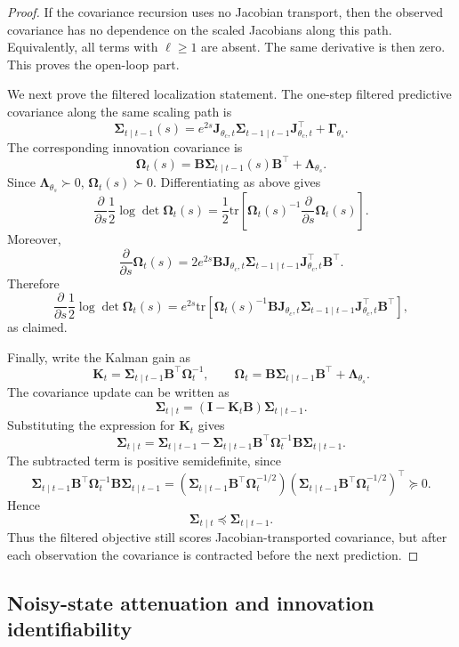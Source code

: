 \documentclass{article}
\theoremstyle{plain}
\theoremstyle{definition}
\theoremstyle{remark}
\newcommand{\tr}{\mathrm{tr}}
\begin{document}
\begin{proof}
If the covariance recursion uses no Jacobian transport, then the observed
covariance has no dependence on the scaled Jacobians along this path. Equivalently,
all terms with $\ell\ge1$ are absent. The same derivative is then zero. This
proves the open-loop part.

We next prove the filtered localization statement. The one-step filtered
predictive covariance along the same scaling path is
\[
\bm\Sigma_{t\mid t-1}(s)
=
e^{2s}
\bm J_{\theta_c,t}\bm\Sigma_{t-1\mid t-1}
\bm J_{\theta_c,t}^{\top}
+
\bm\Gamma_{\theta_s}.
\]
The corresponding innovation covariance is
\[
\bm\Omega_t(s)
=
\bm B\bm\Sigma_{t\mid t-1}(s)\bm B^\top+\bm\Lambda_{\theta_s}.
\]
Since $\bm\Lambda_{\theta_s}\succ0$, $\bm\Omega_t(s)\succ0$. Differentiating as
above gives
\[
\frac{\partial}{\partial s}
\frac12\log\det\bm\Omega_t(s)
=
\frac12
\tr \left[
\bm\Omega_t(s)^{-1}
\frac{\partial}{\partial s}\bm\Omega_t(s)
\right].
\]
Moreover,
\[
\frac{\partial}{\partial s}\bm\Omega_t(s)
=
2e^{2s}
\bm B\bm J_{\theta_c,t}\bm\Sigma_{t-1\mid t-1}
\bm J_{\theta_c,t}^{\top}\bm B^\top.
\]
Therefore
\[
\frac{\partial}{\partial s}
\frac12\log\det\bm\Omega_t(s)
=
e^{2s}
\tr \left[
\bm\Omega_t(s)^{-1}
\bm B\bm J_{\theta_c,t}\bm\Sigma_{t-1\mid t-1}
\bm J_{\theta_c,t}^{\top}\bm B^\top
\right],
\]
as claimed.

Finally, write the Kalman gain as
\[
\bm K_t
=
\bm\Sigma_{t\mid t-1}\bm B^\top\bm\Omega_t^{-1},
\qquad
\bm\Omega_t
=
\bm B\bm\Sigma_{t\mid t-1}\bm B^\top+\bm\Lambda_{\theta_s}.
\]
The covariance update can be written as
\[
\bm\Sigma_{t\mid t}
=
(\bm I-\bm K_t\bm B)\bm\Sigma_{t\mid t-1}.
\]
Substituting the expression for $\bm K_t$ gives
\[
\bm\Sigma_{t\mid t}
=
\bm\Sigma_{t\mid t-1}
-
\bm\Sigma_{t\mid t-1}\bm B^\top
\bm\Omega_t^{-1}
\bm B\bm\Sigma_{t\mid t-1}.
\]
The subtracted term is positive semidefinite, since
\[
\bm\Sigma_{t\mid t-1}\bm B^\top
\bm\Omega_t^{-1}
\bm B\bm\Sigma_{t\mid t-1}
=
\left(
\bm\Sigma_{t\mid t-1}\bm B^\top\bm\Omega_t^{-1/2}
\right)
\left(
\bm\Sigma_{t\mid t-1}\bm B^\top\bm\Omega_t^{-1/2}
\right)^\top
\succeq0.
\]
Hence
\[
\bm\Sigma_{t\mid t}
\preceq
\bm\Sigma_{t\mid t-1}.
\]
Thus the filtered objective still scores Jacobian-transported covariance, but
after each observation the covariance is contracted before the next prediction.
\end{proof}

\subsection{Noisy-state attenuation and innovation identifiability}
\label{app:attenuation_diagnostic}
\end{document}
